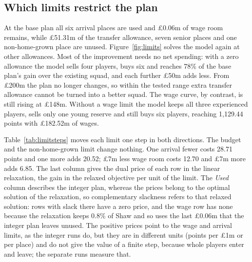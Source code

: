 \subsection{Which limits restrict the plan}\label{sec:limits}\label{sec:budget}

At the base plan all six arrival places are used and \pounds 0.06m of wage room remains, while \pounds 51.31m of the transfer allowance, seven senior places and one non-home-grown place are unused. Figure~\ref{fig:limits} solves the model again at other allowances. Most of the improvement needs no net spending: with a zero allowance the model sells four players, buys six and reaches 78\% of the base plan's gain over the existing squad, and each further \pounds 50m adds less. From \pounds 200m the plan no longer changes, so within the tested range extra transfer allowance cannot be turned into a better squad. The wage curve, by contrast, is still rising at \pounds 148m. Without a wage limit the model keeps all three experienced players, sells only one young reserve and still buys six players, reaching 1,129.44 points with \pounds 182.52m of wages.



Table~\ref{tab:limitsteps} moves each limit one step in both directions. The budget and the non-home-grown limit change nothing. One arrival fewer costs 28.71 points and one more adds 20.52; \pounds 7m less wage room costs 12.70 and \pounds 7m more adds 6.85. The last column gives the dual price of each row in the linear relaxation, the gain in the relaxed objective per unit of the limit. The \emph{Used} column describes the integer plan, whereas the prices belong to the optimal solution of the relaxation, so complementary slackness refers to that relaxed solution: rows with slack there have a zero price, and the wage row has none because the relaxation keeps 0.8\% of Shaw and so uses the last \pounds 0.06m that the integer plan leaves unused. The positive prices point to the wage and arrival limits, as the integer runs do, but they are in different units (points per \pounds 1m or per place) and do not give the value of a finite step, because whole players enter and leave; the separate runs measure that.

\begin{table}[!htbp]
\centering
\caption{Change in objective when one limit is moved one step and every other input is as in the base case. Price: dual price of the row in the linear relaxation of the base model, in points per unit (\pounds 1m or one place).}\label{tab:limitsteps}
\end{table}

